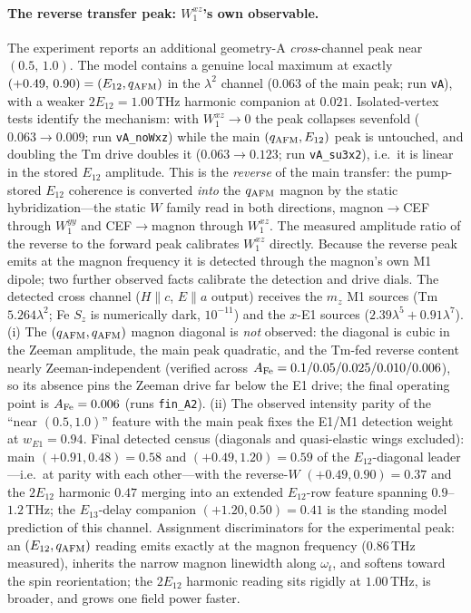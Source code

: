 \documentclass[11pt]{article}
\newcommand{\qafm}{q_{\rm AFM}}
\begin{document}
\paragraph{The reverse transfer peak: $W^{xz}_1$'s own observable.}
The experiment reports an additional geometry-A \emph{cross}-channel
peak near $(0.5,\,1.0)$.  The model contains a genuine local maximum at
exactly $(+0.49,\,0.90)=(E_{12},\qafm)$ in the $\lambda^2$ channel
($0.063$ of the main peak; run \texttt{vA}), with a weaker
$2E_{12}=1.00$\,THz harmonic companion at $0.021$.  Isolated-vertex
tests identify the mechanism: with $W^{xz}_1\to0$ the peak collapses
sevenfold ($0.063\to0.009$; run \texttt{vA\_noWxz}) while the main
$(\qafm,E_{12})$ peak is untouched, and doubling the Tm drive doubles it
($0.063\to0.123$; run \texttt{vA\_su3x2}), i.e.\ it is linear in the
stored $E_{12}$ amplitude.  This is the \emph{reverse} of the main
transfer: the pump-stored $E_{12}$ coherence is converted \emph{into}
the $\qafm$ magnon by the static hybridization---the static $W$ family
read in both directions, magnon$\to$CEF through $W^{yy}_1$ and
CEF$\to$magnon through $W^{xz}_1$.  The measured amplitude ratio of the
reverse to the forward peak calibrates $W^{xz}_1$ directly.  Because
the reverse peak emits at the magnon frequency it is detected through
the magnon's own M1 dipole; two further observed facts calibrate the
detection and drive dials.  The detected cross channel
($H\parallel c$, $E\parallel a$ output) receives the $m_z$ M1 sources
(Tm $5.264\lambda^2$; Fe $S_z$ is numerically dark, $10^{-11}$) and
the $x$-E1 sources ($2.39\lambda^5+0.91\lambda^7$).  (i) The
$(\qafm,\qafm)$ magnon diagonal is \emph{not} observed: the diagonal
is cubic in the Zeeman amplitude, the main peak quadratic, and the
Tm-fed reverse content nearly Zeeman-independent (verified across
$A_{\rm Fe}=0.1/0.05/0.025/0.010/0.006$), so its absence pins the
Zeeman drive far below the E1 drive; the final operating point is
$A_{\rm Fe}=0.006$ (runs \texttt{fin\_A2}).  (ii) The observed
intensity parity of the ``near $(0.5,1.0)$'' feature with the main
peak fixes the E1/M1 detection weight at $w_{E1}=0.94$.  Final
detected census (diagonals and quasi-elastic wings excluded): main
$(+0.91,0.48)=0.58$ and $(+0.49,1.20)=0.59$ of the $E_{12}$-diagonal
leader---i.e.\ at parity with each other---with the reverse-$W$
$(+0.49,0.90)=0.37$ and the $2E_{12}$ harmonic $0.47$ merging into an
extended $E_{12}$-row feature spanning $0.9$--$1.2$\,THz; the
$E_{13}$-delay companion $(+1.20,0.50)=0.41$ is the standing model
prediction of this channel.
Assignment discriminators for the experimental peak: an
$(E_{12},\qafm)$ reading emits exactly at the magnon frequency
($0.86$\,THz measured), inherits the narrow magnon linewidth along
$\omega_t$, and softens toward the spin reorientation; the
$2E_{12}$ harmonic reading sits rigidly at $1.00$\,THz, is broader, and
grows one field power faster.
\end{document}

